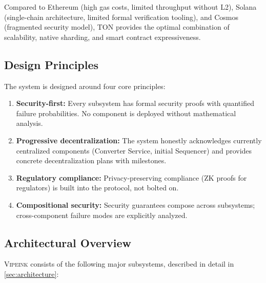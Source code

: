 \documentclass[12pt,a4paper]{article}
\theoremstyle{definition}
\theoremstyle{remark}
\newcommand{\Vipeink}{\textsc{Vipeink}}
\begin{document}
Compared to Ethereum (high gas costs, limited throughput without L2), Solana (single-chain architecture, limited formal verification tooling), and Cosmos (fragmented security model), TON provides the optimal combination of scalability, native sharding, and smart contract expressiveness.

\subsection{Design Principles}

The system is designed around four core principles:

\begin{enumerate}[nosep]
    \item \textbf{Security-first:} Every subsystem has formal security proofs with quantified failure probabilities. No component is deployed without mathematical analysis.
    \item \textbf{Progressive decentralization:} The system honestly acknowledges currently centralized components (Converter Service, initial Sequencer) and provides concrete decentralization plans with milestones.
    \item \textbf{Regulatory compliance:} Privacy-preserving compliance (ZK proofs for regulators) is built into the protocol, not bolted on.
    \item \textbf{Compositional security:} Security guarantees compose across subsystems; cross-component failure modes are explicitly analyzed.
\end{enumerate}

\subsection{Architectural Overview}

\Vipeink{} consists of the following major subsystems, described in detail in \cref{sec:architecture}:
\end{document}
